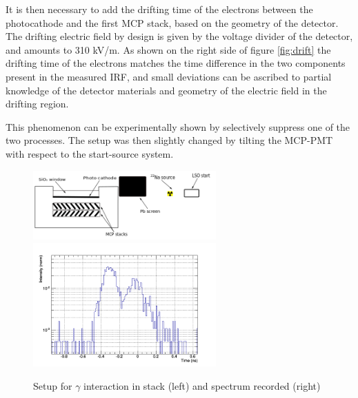 It is then necessary to add the drifting time of the electrons between the photocathode and the first MCP stack, based on the geometry of the detector. The drifting electric field by design is given by the voltage divider of the detector, and amounts to 310 kV/m.
As shown on the right side of figure \ref{fig:drift} the drifting time of the electrons matches the time difference in the two components present in the measured IRF, and small deviations can be ascribed to partial knowledge of the detector materials and geometry of the electric field in the drifting region.

This phenomenon can be experimentally shown by selectively suppress one of the two processes. The setup was then slightly changed by tilting the MCP-PMT with respect to the start-source system.
\begin{figure}[htbp]
\begin{center}
\includegraphics[width=7cm]{../Pictures/Chapter_8/screen_irf_2.png}
\includegraphics[width=7cm]{../Pictures/Chapter_8/turn_1.png}
\end{center}
\caption[Setup for $\gamma$ interaction in stack]{Setup for $\gamma$ interaction in stack (left) and spectrum recorded (right)}
\label{fig:twist2}
\end{figure}
